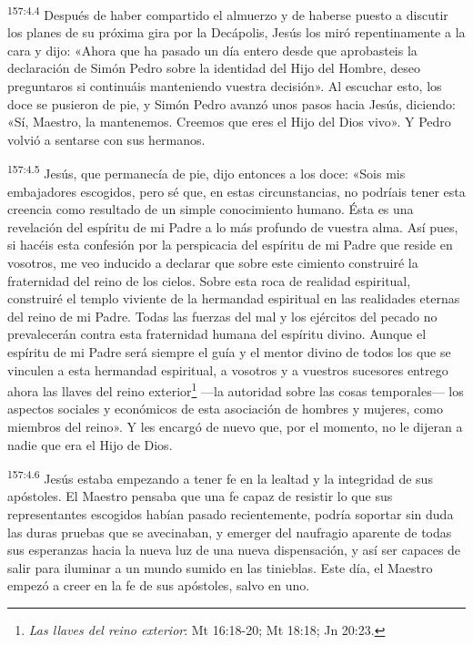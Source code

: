 \par 
\textsuperscript{157:4.4} Después de haber compartido el almuerzo y de haberse puesto a discutir los planes de su próxima gira por la Decápolis, Jesús los miró repentinamente a la cara y dijo: «Ahora que ha pasado un día entero desde que aprobasteis la declaración de Simón Pedro sobre la identidad del Hijo del Hombre, deseo preguntaros si continuáis manteniendo vuestra decisión». Al escuchar esto, los doce se pusieron de pie, y Simón Pedro avanzó unos pasos hacia Jesús, diciendo: «Sí, Maestro, la mantenemos. Creemos que eres el Hijo del Dios vivo». Y Pedro volvió a sentarse con sus hermanos.

\par 
\textsuperscript{157:4.5} Jesús, que permanecía de pie, dijo entonces a los doce: «Sois mis embajadores escogidos, pero sé que, en estas circunstancias, no podríais tener esta creencia como resultado de un simple conocimiento humano. Ésta es una revelación del espíritu de mi Padre a lo más profundo de vuestra alma. Así pues, si hacéis esta confesión por la perspicacia del espíritu de mi Padre que reside en vosotros, me veo inducido a declarar que sobre este cimiento construiré la fraternidad del reino de los cielos. Sobre esta roca de realidad espiritual, construiré el templo viviente de la hermandad espiritual en las realidades eternas del reino de mi Padre. Todas las fuerzas del mal y los ejércitos del pecado no prevalecerán contra esta fraternidad humana del espíritu divino. Aunque el espíritu de mi Padre será siempre el guía y el mentor divino de todos los que se vinculen a esta hermandad espiritual, a vosotros y a vuestros sucesores entrego ahora las llaves del reino exterior\footnote{\textit{Las llaves del reino exterior}: Mt 16:18-20; Mt 18:18; Jn 20:23.} ---la autoridad sobre las cosas temporales--- los aspectos sociales y económicos de esta asociación de hombres y mujeres, como miembros del reino». Y les encargó de nuevo que, por el momento, no le dijeran a nadie que era el Hijo de Dios.

\par 
\textsuperscript{157:4.6} Jesús estaba empezando a tener fe en la lealtad y la integridad de sus apóstoles. El Maestro pensaba que una fe capaz de resistir lo que sus representantes escogidos habían pasado recientemente, podría soportar sin duda las duras pruebas que se avecinaban, y emerger del naufragio aparente de todas sus esperanzas hacia la nueva luz de una nueva dispensación, y así ser capaces de salir para iluminar a un mundo sumido en las tinieblas. Este día, el Maestro empezó a creer en la fe de sus apóstoles, salvo en uno.

